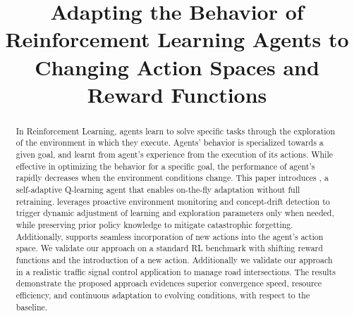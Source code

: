 \documentclass[10pt, conference, ]{IEEEtran}
\begin{document}
\title{Adapting the Behavior of Reinforcement Learning Agents to Changing Action Spaces and Reward Functions}

\author{
}

\maketitle




\begin{abstract}
In Reinforcement Learning, agents learn to solve specific tasks through the 
exploration of the environment in which they execute. Agents' behavior is
specialized towards a given goal, and learnt from agent's experience from the execution of its actions. While effective in optimizing the behavior for a 
specific goal, the performance of agent's rapidly decreases when the environment conditions change.
This paper introduces \adaptiverl, a self-adaptive Q-learning agent that enables on-the-fly adaptation 
without full retraining. \adaptiverl leverages proactive environment monitoring and concept-drift 
detection to trigger dynamic adjustment of learning and exploration parameters only when needed, 
while preserving prior policy knowledge to mitigate catastrophic forgetting. Additionally, \adaptiverl 
supports seamless incorporation of new actions into the agent’s action space. We validate our approach 
on a standard RL benchmark with shifting reward functions and the introduction of a new action. 
Additionally we validate our approach in a realistic traffic signal control application to manage road 
intersections. The results demonstrate the proposed approach evidences superior convergence 
speed, resource efficiency, and continuous adaptation to evolving conditions, with respect to the 
baseline.
\end{abstract}
\end{document}
